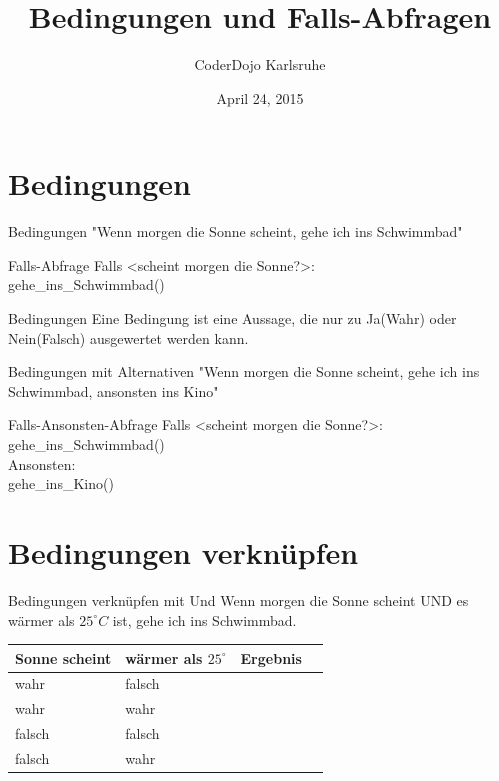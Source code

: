 \documentclass{\VorlagenPfad/coderdojokabeamer}
\title{Bedingungen und Falls-Abfragen}
\author{CoderDojo Karlsruhe}
\date{April 24, 2015}
\begin{document}
\maketitle

\section{Bedingungen}

\begin{frame}{Bedingungen}
  "Wenn morgen die Sonne scheint, gehe ich ins Schwimmbad"
\end{frame}

\begin{frame}{Falls-Abfrage}
	Falls \textless scheint morgen die Sonne?\textgreater:\\
	\noindent\hspace*{12mm} gehe\_ins\_Schwimmbad()
\end{frame}

\begin{frame}{Bedingungen}
	Eine Bedingung ist eine Aussage, die nur zu Ja(Wahr) oder Nein(Falsch) ausgewertet werden kann.
\end{frame}

\begin{frame}{Bedingungen mit Alternativen}
	"Wenn morgen die Sonne scheint, gehe ich ins Schwimmbad, ansonsten ins Kino"
\end{frame}

\begin{frame}{Falls-Ansonsten-Abfrage}
	Falls \textless scheint morgen die Sonne?\textgreater:\\
	\noindent\hspace*{12mm} gehe\_ins\_Schwimmbad()\\
	Ansonsten:\\
	\noindent\hspace*{12mm} gehe\_ins\_Kino()
\end{frame}

\section{Bedingungen verknüpfen}

\begin{frame}{Bedingungen verknüpfen mit Und}
	Wenn morgen die Sonne scheint UND es wärmer als $25^{\circ}C$ ist, gehe ich ins Schwimmbad.
 \begin{table}[t,clr]
 	\begin{center}
 		\begin{tabular}{|l|l|l|l|}
 			\hline
 			Sonne scheint	& wärmer als $25^{\circ}$	& Ergebnis	\\ \hline\hline
 			wahr			& falsch					&			\\ \hline
 			wahr			& wahr						&			\\ \hline
 			falsch			& falsch					&			\\ \hline
 			falsch			& wahr						&			\\ \hline
 		\end{tabular}
 	\end{center}
 \end{table}
\end{frame}
\end{document}
